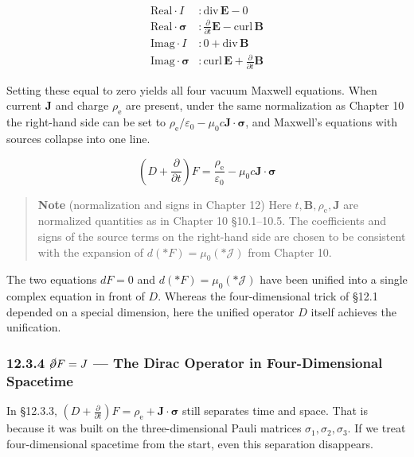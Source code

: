 \[
\begin{aligned}
\text{Real}\cdot I &: \mathrm{div}\,\mathbf{E} - 0 \\
\text{Real}\cdot\bm{\sigma} &: \frac{\partial}{\partial t}\mathbf{E} - \mathrm{curl}\,\mathbf{B} \\
\text{Imag}\cdot I &: 0 + \mathrm{div}\,\mathbf{B} \\
\text{Imag}\cdot\bm{\sigma} &: \mathrm{curl}\,\mathbf{E} + \frac{\partial}{\partial t}\mathbf{B}
\end{aligned}
\]

Setting these equal to zero yields all four vacuum Maxwell equations.
When current \(\mathbf{J}\) and charge \(\rho_{\mathrm e}\) are present,
under the same normalization as Chapter 10 the right-hand side can be
set to
\(\rho_{\mathrm e}/\varepsilon_0 - \mu_0 c \mathbf{J}\!\cdot\!\bm{\sigma}\),
and Maxwell's equations with sources collapse into one line.

\[(D + \frac{\partial}{\partial t})F = \frac{\rho_{\mathrm e}}{\varepsilon_0} - \mu_0 c \mathbf{J}\!\cdot\!\bm{\sigma}\]

\begin{quote}
\textbf{Note} (normalization and signs in Chapter 12) Here
\(t, \mathbf{B}, \rho_{\mathrm e}, \mathbf{J}\) are normalized
quantities as in Chapter 10 §10.1--10.5. The coefficients and signs of
the source terms on the right-hand side are chosen to be consistent with
the expansion of \(d(\ast F) = \mu_0(\ast\mathcal{J})\) from Chapter 10.
\end{quote}

The two equations \(dF=0\) and \(d(\ast F)=\mu_0(\ast\mathcal{J})\) have
been unified into a single complex equation in front of \(D\). Whereas
the four-dimensional trick of §12.1 depended on a special dimension,
here the unified operator \(D\) itself achieves the unification.

\hypertarget{cancelpartial-f-j-the-dirac-operator-in-four-dimensional-spacetime}{%
\subsubsection{\texorpdfstring{12.3.4 \(\cancel{\partial} F = J\) ---
The Dirac Operator in Four-Dimensional
Spacetime}{12.3.4 \textbackslash cancel\{\textbackslash partial\} F = J --- The Dirac Operator in Four-Dimensional Spacetime}}\label{cancelpartial-f-j-the-dirac-operator-in-four-dimensional-spacetime}}

In §12.3.3,
\((D + \frac{\partial}{\partial t})F = \rho_{\mathrm e} + \mathbf{J}\!\cdot\!\bm{\sigma}\)
still separates time and space. That is because it was built on the
three-dimensional Pauli matrices \(\sigma_1,\sigma_2,\sigma_3\). If we
treat four-dimensional spacetime from the start, even this separation
disappears.

